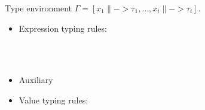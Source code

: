Type environment $\Gamma = [x_1 \|-> \tau_1, ..., x_i \|-> {\tau_i} ]$.
\begin{itemize}

\item Expression typing rules:\\


\\[1ex]


\\[2ex]


\item Auxiliary 

\PT{\Axiom{\Typef{\iotan}{\int} {\tseq{\int}}}}
\PT{\Axiom{\Typef{\plusn}{\int,\int} {\int}}}

\item Value typing rules: \\



\end{itemize}

